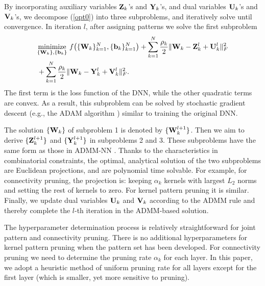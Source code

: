 \documentclass[sigplan,screen]{acmart}
\begin{document}
By incorporating auxiliary variables ${\bf{Z}}_{k}$'s and ${\bf{Y}}_{k}$'s, and dual variables ${\bf{U}}_{k}$'s and ${\bf{V}}_{k}$'s, we decompose (\ref{opt0}) into three subproblems, and iteratively solve until convergence.
In iteration $l$, after assigning patterns we solve the first subproblem\vspace{-0.1in}
\begin{align}\label{eqn:5}\small \nonumber
 &\underset{ \{{\bf{W}}_{k}\},\{{\bf{b}}_{k} \}}{\text{minimize}}
\ f \big( \{{\bf{W}}_{k} \}_{k=1}^N, \{{\bf{b}}_{k} \}_{k=1}^N \big)+\sum_{k=1}^{N} \frac{\rho_{k}}{2}  \| {\bf{W}}_{k}-{\bf{Z}}_{k}^{l}+{\bf{U}}_{k}^{l} \|_{F}^{2}\vspace{-0.1in}\\
&+  \sum_{k=1}^{N} \frac{\rho_{k}}{2}  \| {\bf{W}}_{k}-{\bf{Y}}_{k}^{l}+{\bf{V}}_{k}^{l} \|_{F}^{2}.
\vspace{-0.5in}\end{align}
The first term is the loss function of the DNN, while the other quadratic terms are convex. 
As a result, this subproblem can be solved by stochastic gradient descent (e.g., the ADAM algorithm \cite{kingma2014adam}) similar to training the original DNN.

The solution $\{{\bf{W}}_{k}\}$ of subproblem 1 is denoted by $\{{\bf{W}}^{l+1}_{k}\}$. Then we aim to derive $\{{\bf{Z}}^{l+1}_{k}\}$ and $\{{\bf{Y}}^{l+1}_{k}\}$ in subproblems 2 and 3. These subproblems have the same form as those in ADMM-NN \cite{ren2019ADMMNN}. Thanks to the characteristics in combinatorial constraints, the optimal, analytical solution of the two subproblems are Euclidean projections, and are polynomial time solvable. For example, for connectivity pruning, the projection is: keeping $\alpha_k$ kernels with largest $L_2$ norms and setting the rest of kernels to zero. For kernel pattern pruning it is similar.
Finally, we update dual variables ${\bf{U}}_{k}$ and ${\bf{V}}_{k}$ according to the ADMM rule \cite{boyd2011distributed} and thereby complete the $l$-th iteration in the ADMM-based solution.


The hyperparameter determination process is relatively straightforward for joint pattern and connectivity pruning. There is no additional hyperparameters for kernel pattern pruning when the pattern set has been developed. For connectivity pruning we need to determine the pruning rate $\alpha_k$ for each layer. In this paper, we adopt a heuristic method of uniform pruning rate for all layers except for the first layer (which is smaller, yet more sensitive to pruning). 
\end{document}
